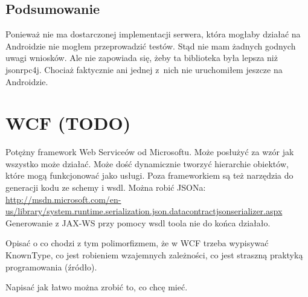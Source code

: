 \subsection{Podsumowanie}
Ponieważ nie ma dostarczonej implementacji serwera, która mogłaby działać na Androidzie nie mogłem przeprowadzić testów.
Stąd nie mam żadnych godnych uwagi wniosków.
Ale nie zapowiada się, żeby ta biblioteka była lepsza niż jsonrpc4j. Chociaż faktycznie ani jednej z~nich nie uruchomiłem jeszcze na Androidzie.




\section{WCF (TODO)}
Potężny framework Web Serviceów od Microsoftu. Może posłużyć za wzór jak wszystko może działać. Może dość dynamicznie tworzyć hierarchie obiektów, które mogą funkcjonować jako usługi.
Poza frameworkiem są też narzędzia do generacji kodu ze schemy i wsdl.
Można robić JSONa: \url{http://msdn.microsoft.com/en-us/library/system.runtime.serialization.json.datacontractjsonserializer.aspx}\\

Generowanie z JAX-WS przy pomocy wsdl toola nie do końca działało.

Opisać o co chodzi z tym polimorfizmem, że w WCF trzeba wypisywać KnownType, co jest robieniem wzajemnych zależności, co jest straszną praktyką programowania (źródło).

Napisać jak łatwo można zrobić to, co chcę mieć.




